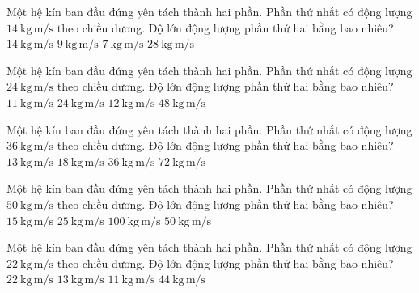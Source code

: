 \begin{ex}
Một hệ kín ban đầu đứng yên tách thành hai phần. Phần thứ nhất có động lượng $14\ \mathrm{kg\,m/s}$ theo chiều dương. Độ lớn động lượng phần thứ hai bằng bao nhiêu?
\choice
{\True $14\ \mathrm{kg\,m/s}$}
{$9\ \mathrm{kg\,m/s}$}
{$7\ \mathrm{kg\,m/s}$}
{$28\ \mathrm{kg\,m/s}$}
\end{ex}

\begin{ex}
Một hệ kín ban đầu đứng yên tách thành hai phần. Phần thứ nhất có động lượng $24\ \mathrm{kg\,m/s}$ theo chiều dương. Độ lớn động lượng phần thứ hai bằng bao nhiêu?
\choice
{$11\ \mathrm{kg\,m/s}$}
{\True $24\ \mathrm{kg\,m/s}$}
{$12\ \mathrm{kg\,m/s}$}
{$48\ \mathrm{kg\,m/s}$}
\end{ex}

\begin{ex}
Một hệ kín ban đầu đứng yên tách thành hai phần. Phần thứ nhất có động lượng $36\ \mathrm{kg\,m/s}$ theo chiều dương. Độ lớn động lượng phần thứ hai bằng bao nhiêu?
\choice
{$13\ \mathrm{kg\,m/s}$}
{$18\ \mathrm{kg\,m/s}$}
{\True $36\ \mathrm{kg\,m/s}$}
{$72\ \mathrm{kg\,m/s}$}
\end{ex}

\begin{ex}
Một hệ kín ban đầu đứng yên tách thành hai phần. Phần thứ nhất có động lượng $50\ \mathrm{kg\,m/s}$ theo chiều dương. Độ lớn động lượng phần thứ hai bằng bao nhiêu?
\choice
{$15\ \mathrm{kg\,m/s}$}
{$25\ \mathrm{kg\,m/s}$}
{$100\ \mathrm{kg\,m/s}$}
{\True $50\ \mathrm{kg\,m/s}$}
\end{ex}

\begin{ex}
Một hệ kín ban đầu đứng yên tách thành hai phần. Phần thứ nhất có động lượng $22\ \mathrm{kg\,m/s}$ theo chiều dương. Độ lớn động lượng phần thứ hai bằng bao nhiêu?
\choice
{\True $22\ \mathrm{kg\,m/s}$}
{$13\ \mathrm{kg\,m/s}$}
{$11\ \mathrm{kg\,m/s}$}
{$44\ \mathrm{kg\,m/s}$}
\end{ex}

